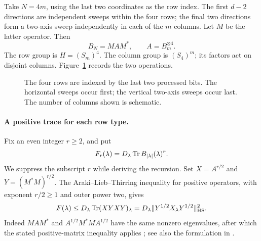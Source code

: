 Take $N=4m$, using the last two coordinates as the row index. The first $d-2$ directions are independent sweeps within the four rows; the final two directions form a two-axis sweep independently in each of the $m$ columns. Let $M$ be the latter operator. Then
\begin{equation}\label{eq:split}
 B_N=MAM^*,\qquad A=B_m^{\otimes4}.
\end{equation}
The row group is $H=(S_m)^4$. The column group is $(S_4)^m$; its factors act on disjoint columns. Figure~\ref{fig:fourrows} records the two operations.

\begin{figure}[ht]
\centering
{}
\caption{The four rows are indexed by the last two processed bits. The horizontal sweeps occur first; the vertical two-axis sweeps occur last. The number of columns shown is schematic.}\label{fig:fourrows}
\end{figure}

\paragraph{A positive trace for each row type.}
Fix an even integer $r\ge2$, and put
\[
 F_r(\lambda)=D_\lambda\operatorname{Tr} B_{|\lambda|}(\lambda)^r.
\]
We suppress the subscript $r$ while deriving the recursion. Set $X=A^{r/2}$ and $Y=(M^*M)^{r/2}$. The Araki--Lieb--Thirring inequality for positive operators, with exponent $r/2\ge1$ and outer power two, gives
\begin{equation}\label{eq:alt}
 F(\lambda)\le D_\lambda\operatorname{Tr}(XYXY)_\lambda
 =D_\lambda\|Y^{1/2}X_\lambda Y^{1/2}\|_{\mathrm{HS}}^2.
\end{equation}
Indeed $MAM^*$ and $A^{1/2}M^*MA^{1/2}$ have the same nonzero eigenvalues, after which the stated positive-matrix inequality applies \cite{araki1990}; see also the formulation in \cite[Theorem~1]{audenaert2007}.

